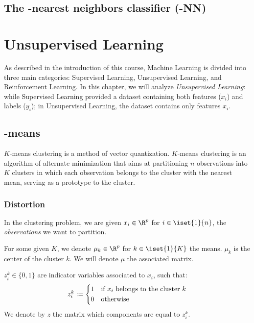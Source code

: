 \documentclass[toc, titlepaged]{../cs-classes/cs-classes}
\begin{document}
\subsection{The -nearest neighbors classifier (-NN)}

\section{Unsupervised Learning}
As described in the introduction of this course, Machine Learning is divided into three main categories: Supervised Learning, Unsupervised Learning, and Reinforcement Learning. In this chapter, we will analyze \emph{Unsupervised Learning}: while Supervised Learning provided a dataset containing both features ($x_i$) and labels ($y_i$); in Unsupervised Learning, the dataset contains only features $x_i$.

\subsection{-means}
$K$-means clustering is a method of vector quantization. $K$-means clustering is an algorithm of alternate minimization that aims at partitioning $n$ observations into $K$ clusters in which each observation belongs to the cluster with the nearest mean, serving as a prototype to the cluster.


\subsubsection{Distortion}
\begin{definition}[Observations]
    In the clustering problem, we are given $x_i\in\R^p$ for $i\in\iset{1}{n}$, the \emph{observations} we want to partition.
\end{definition}

\begin{definition}[Means]
    For some given $K$, we denote $\mu_k\in\R^p$ for $k\in\iset{1}{K}$ the means. $\mu_k$ is the center of the cluster $k$. We will denote $\mu$ the associated matrix.
\end{definition}

\begin{definition}
    $z_i^k\in\{0, 1\}$ are indicator variables associated to $x_i$, such that:
    \begin{equation*}
        z_i^k := \begin{cases*}
            1 & if $x_i$ belongs to the cluster $k$\\
            0 & otherwise
        \end{cases*}
    \end{equation*}
    We denote by $z$ the matrix which components are equal to $z_i^k$.
\end{definition}
\end{document}
